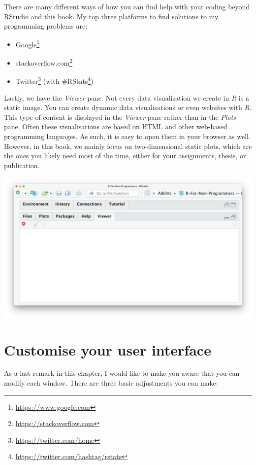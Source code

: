 \documentclass[
  letterpaper,
]{krantz}
\renewcommand{\href}[2]{#2\footnote{\url{#1}}}
\begin{document}
There are many different ways of how you can find help with your coding
beyond RStudio and this book. My top three platforms to find solutions
to my programming problems are:

\begin{itemize}
\item
  \href{https://www.google.com}{Google}
\item
  \href{https://stackoverflow.com}{stackoverflow.com}
\item
  \href{https://twitter.com/home}{Twitter} (with
  \href{https://twitter.com/hashtag/rstats}{\#RStats})
\end{itemize}

Lastly, we have the \emph{Viewer} pane. Not every data visualisation we
create in \emph{R} is a static image. You can create dynamic data
visualisations or even websites with \emph{R}. This type of content is
displayed in the \emph{Viewer} pane rather than in the \emph{Plots}
pane. Often these visualisations are based on HTML and other web-based
programming languages. As such, it is easy to open them in your browser
as well. However, in this book, we mainly focus on two-dimensional
static plots, which are the ones you likely need most of the time,
either for your assignments, thesis, or publication.

\includegraphics{images/chapter_04_img/05_files_plots_etc/05_rstudio_viewer.png}

\section{Customise your user
interface}\label{sec-customise-your-user-interface}

As a last remark in this chapter, I would like to make you aware that
you can modify each window. There are three basic adjustments you can
make:
\end{document}
